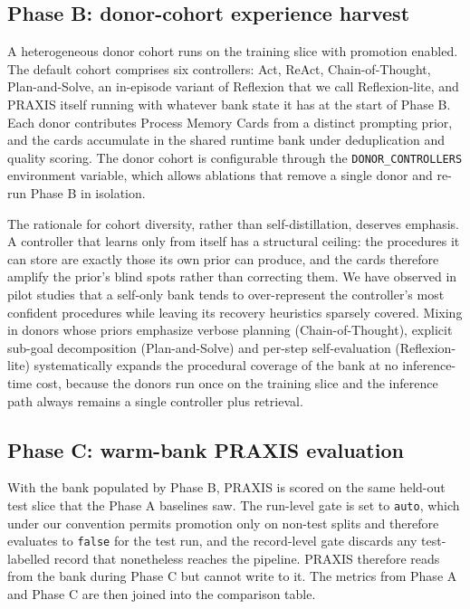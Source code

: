 \documentclass[conference]{IEEEtran}
\begin{document}
\subsection{Phase B: donor-cohort experience harvest}

A heterogeneous donor cohort runs on the training slice with
promotion enabled. The default cohort comprises six controllers:
Act, ReAct, Chain-of-Thought, Plan-and-Solve, an in-episode
variant of Reflexion that we call Reflexion-lite, and PRAXIS
itself running with whatever bank state it has at the start of
Phase B. Each donor contributes Process Memory Cards from a
distinct prompting prior, and the cards accumulate in the shared
runtime bank under deduplication and quality scoring. The donor
cohort is configurable through the \texttt{DONOR\_CONTROLLERS}
environment variable, which allows ablations that remove a single
donor and re-run Phase B in isolation.

The rationale for cohort diversity, rather than self-distillation,
deserves emphasis. A controller that learns only from itself has a
structural ceiling: the procedures it can store are exactly those
its own prior can produce, and the cards therefore amplify the
prior's blind spots rather than correcting them. We have observed
in pilot studies that a self-only bank tends to over-represent the
controller's most confident procedures while leaving its recovery
heuristics sparsely covered. Mixing in donors whose priors
emphasize verbose planning (Chain-of-Thought), explicit sub-goal
decomposition (Plan-and-Solve) and per-step self-evaluation
(Reflexion-lite) systematically expands the procedural coverage
of the bank at no inference-time cost, because the donors run
once on the training slice and the inference path always remains
a single controller plus retrieval.

\subsection{Phase C: warm-bank PRAXIS evaluation}

With the bank populated by Phase B, PRAXIS is scored on the same
held-out test slice that the Phase A baselines saw. The run-level
gate is set to \texttt{auto}, which under our convention permits
promotion only on non-test splits and therefore evaluates to
\texttt{false} for the test run, and the record-level gate
discards any test-labelled record that nonetheless reaches the
pipeline. PRAXIS therefore reads from the bank during Phase C but
cannot write to it. The metrics from Phase A and Phase C are then
joined into the comparison table.
\end{document}
